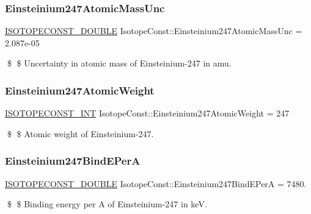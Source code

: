 \subsubsection{\texorpdfstring{Einsteinium247\+Atomic\+Mass\+Unc}{Einsteinium247AtomicMassUnc}}
{\footnotesize\ttfamily \mbox{\hyperlink{group___isotope_const-_macros_ga8f45a7272ce02c0b4c65c44636ed719a}{I\+S\+O\+T\+O\+P\+E\+C\+O\+N\+S\+T\+\_\+\+D\+O\+U\+B\+LE}} Isotope\+Const\+::\+Einsteinium247\+Atomic\+Mass\+Unc = 2.\+087e-\/05}

\$ \$ Uncertainty in atomic mass of Einsteinium-\/247 in amu. \mbox{\label{group___isotope_const-_einsteinium-_es247_gac638379bc26970ea3e6f8f4d88b9a42d}} 
\subsubsection{\texorpdfstring{Einsteinium247\+Atomic\+Weight}{Einsteinium247AtomicWeight}}
{\footnotesize\ttfamily \mbox{\hyperlink{group___isotope_const-_macros_ga5f18360b3e99483a35c32d789e62621c}{I\+S\+O\+T\+O\+P\+E\+C\+O\+N\+S\+T\+\_\+\+I\+NT}} Isotope\+Const\+::\+Einsteinium247\+Atomic\+Weight = 247}

\$ \$ Atomic weight of Einsteinium-\/247. \mbox{\label{group___isotope_const-_einsteinium-_es247_ga94f4585be5b7c7222989f6a58d7e3418}} 
\subsubsection{\texorpdfstring{Einsteinium247\+Bind\+E\+PerA}{Einsteinium247BindEPerA}}
{\footnotesize\ttfamily \mbox{\hyperlink{group___isotope_const-_macros_ga8f45a7272ce02c0b4c65c44636ed719a}{I\+S\+O\+T\+O\+P\+E\+C\+O\+N\+S\+T\+\_\+\+D\+O\+U\+B\+LE}} Isotope\+Const\+::\+Einsteinium247\+Bind\+E\+PerA = 7480.}

\$ \$ Binding energy per A of Einsteinium-\/247 in keV. \mbox{\label{group___isotope_const-_einsteinium-_es247_ga861a85ac9d861759d3f421f9d8f338ea}} 
